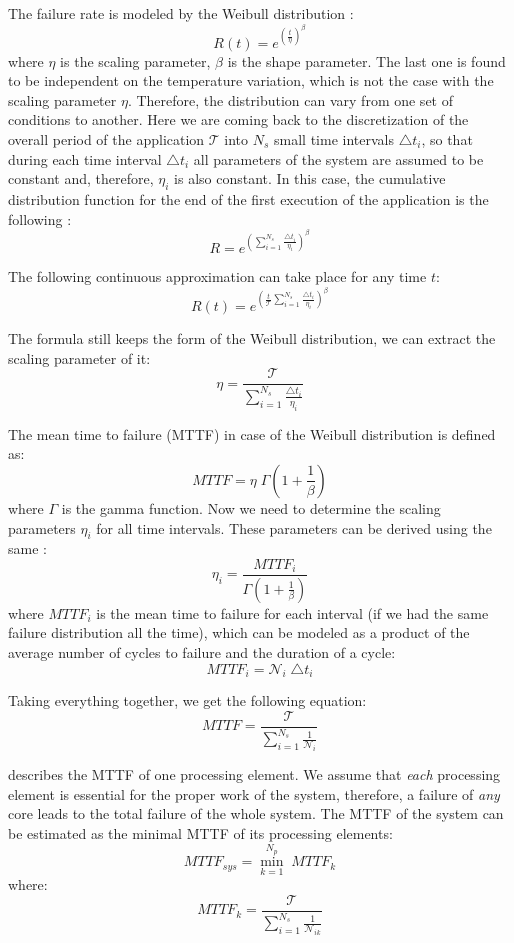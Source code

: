 The failure rate is modeled by the Weibull distribution \cite{xiang2010}:
\[
  R(t) = e^{(\frac{t}{\eta})^\beta}
\]
where $\eta$ is the scaling parameter, $\beta$ is the shape parameter. The last one is found to be independent on the temperature variation, which is not the case with the scaling parameter $\eta$. Therefore, the distribution can vary from one set of conditions to another. Here we are coming back to the discretization of the overall period of the application $\mathcal{T}$ into $N_s$ small time intervals $\triangle t_i$, so that during each time interval $\triangle t_i$ all parameters of the system are assumed to be constant and, therefore, $\eta_i$ is also constant. In this case, the cumulative distribution function for the end of the first execution of the application is the following \cite{xiang2010}:
\[
  R = e^{(\sum_{i=1}^{N_s} \frac{\triangle t_i}{\eta_i})^\beta}
\]

The following continuous approximation can take place for any time $t$:
\[
  R(t) = e^{(\frac{t}{\mathcal{T}} \sum_{i=1}^{N_s} \frac{\triangle t_i}{\eta_i})^\beta}
\]

The formula still keeps the form of the Weibull distribution, we can extract the scaling parameter of it:
\[
  \eta = \frac{\mathcal{T}}{\sum_{i=1}^{N_s} \frac{\triangle t_i}{\eta_i}}
\]

The mean time to failure (MTTF) in case of the Weibull distribution is defined as:
\begin{equation} \label{eq:general-mttf}
  MTTF = \eta \; \Gamma(1 + \frac{1}{\beta})
\end{equation}
where $\Gamma$ is the gamma function. Now we need to determine the scaling parameters $\eta_i$ for all time intervals. These parameters can be derived using the same :
\[
  \eta_i = \frac{MTTF_i}{\Gamma(1 + \frac{1}{\beta})}
\]
where $MTTF_i$ is the mean time to failure for each interval (if we had the same failure distribution all the time), which can be modeled as a product of the average number of cycles to failure  and the duration of a cycle:
\[
  MTTF_i = \mathcal{N}_i \; \triangle t_i
\]

Taking everything together, we get the following equation:
\begin{equation} \label{eq:one-mttf}
  MTTF = \frac{\mathcal{T}}{\sum_{i=1}^{N_s} \frac{1}{\mathcal{N}_i}}
\end{equation}

 describes the MTTF of one processing element. We assume that \emph{each} processing element is essential for the proper work of the system, therefore, a failure of \emph{any} core leads to the total failure of the whole system. The MTTF of the system can be estimated as the minimal MTTF of its processing elements:
\[
  MTTF_{sys} = \min_{k=1}^{N_p} \; MTTF_k
\]
where:
\[
  MTTF_k = \frac{\mathcal{T}}{\sum_{i=1}^{N_s} \frac{1}{\mathcal{N}_{ik}}}
\]

